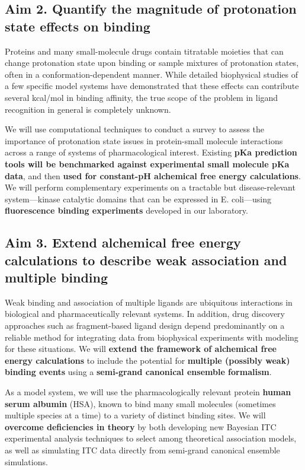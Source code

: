 \documentclass[10pt,final]{article}
\begin{document}
\subsection*{Aim 2. Quantify the magnitude of protonation state effects on binding}
Proteins and many small-molecule drugs contain titratable moieties that can change protonation state upon binding or sample mixtures of protonation states, often in a conformation-dependent manner.
While detailed biophysical studies of a few specific model systems have demonstrated that these effects can contribute several kcal/mol in binding affinity, the true scope of the problem in ligand recognition in general is completely unknown.

We will use computational techniques to conduct a survey to assess the importance of protonation state issues in protein-small molecule interactions across a range of systems of pharmacological interest.
Existing \textbf{ pKa prediction tools will be benchmarked against experimental small molecule pKa data}, and then \textbf{ used for constant-pH alchemical free energy calculations}.
We will perform complementary experiments on a tractable but disease-relevant system---kinase catalytic domains that can be expressed in E. coli---using \textbf{ fluorescence binding experiments } developed in our laboratory.

\subsection*{Aim 3. Extend alchemical free energy calculations to describe weak association and multiple binding}
Weak binding and association of multiple ligands are ubiquitous interactions in biological and pharmaceutically relevant systems.
In addition, drug discovery approaches such as fragment-based ligand design depend predominantly on a reliable method for integrating data from biophysical experiments with modeling for these situations.
We will \textbf{ extend the framework of alchemical free energy calculations}  to include the potential for \textbf{ multiple (possibly weak) binding events } using a \textbf{ semi-grand canonical ensemble formalism}.

As a model system, we will use the pharmacologically relevant protein \textbf{ human serum albumin } (HSA), known to bind many small molecules (sometimes multiple species at a time) to a variety of distinct binding sites.
We will  \textbf{ overcome deficiencies in theory } by both developing new Bayesian ITC experimental analysis techniques to select among theoretical association models, as well as simulating ITC data directly from semi-grand canonical ensemble simulations.
\end{document}
